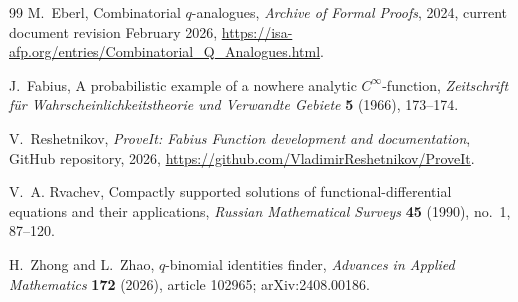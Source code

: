\documentclass[11pt,oneside,openany]{book}
\theoremstyle{definition}
\theoremstyle{remark}
\begin{document}
\begin{thebibliography}{99}
M.~Eberl,
Combinatorial $q$-analogues,
\emph{Archive of Formal Proofs}, 2024, current document revision February 2026,
\url{https://isa-afp.org/entries/Combinatorial_Q_Analogues.html}.

J.~Fabius,
A probabilistic example of a nowhere analytic $C^\infty$-function,
\emph{Zeitschrift f\"ur Wahrscheinlichkeitstheorie und Verwandte Gebiete} \textbf{5} (1966), 173--174.

V.~Reshetnikov,
\emph{ProveIt: Fabius Function development and documentation},
GitHub repository, 2026,
\url{https://github.com/VladimirReshetnikov/ProveIt}.

V.~A. Rvachev,
Compactly supported solutions of functional-differential equations and their applications,
\emph{Russian Mathematical Surveys} \textbf{45} (1990), no.~1, 87--120.

H.~Zhong and L.~Zhao,
$q$-binomial identities finder,
\emph{Advances in Applied Mathematics} \textbf{172} (2026), article 102965;
arXiv:2408.00186.

\end{thebibliography}

\printindex
\end{document}
